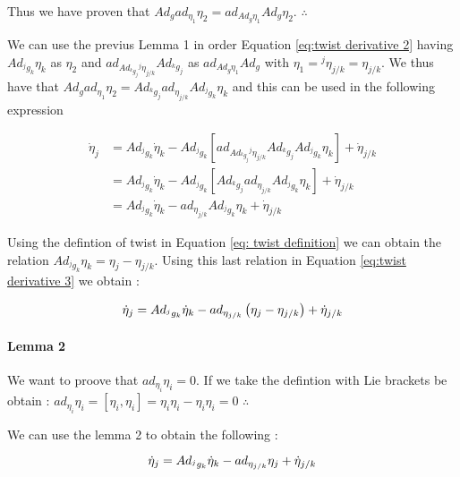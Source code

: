 \documentclass[12pt,a4paper]{book}
\begin{document}
Thus we have proven that $Ad_g ad_{\eta_1}\eta_2 = ad_{Ad_g\eta_1} Ad_g \eta_2$. $\therefore$


We can use the previus Lemma 1 in order Equation \eqref{eq:twist derivative 2} having $Ad_{^jg_k} \eta_k$ as $\eta_2$ and $ad_{Ad_{^kg_j} {^j {\eta}}_{j/k}} Ad_{^kg_j} $ as $ad_{Ad_g\eta_1} Ad_g$ with $\eta_1 = {^j {\eta}}_{j/k} = {\eta}_{j/k}$. We thus have that $Ad_g ad_{\eta_1}\eta_2 = Ad_{^kg_j} ad_{{\eta}_{j/k}} Ad_{^jg_k} \eta_k$ and this can be used in the following expression

\begin{equation}\label{eq:twist derivative 3}
\begin{aligned}
	\dot{\eta}_j 	&= Ad_{^jg_k} \dot{\eta}_k -  Ad_{^jg_k} \left[ ad_{Ad_{^kg_j} {^j {\eta}}_{j/k}} Ad_{^kg_j}  Ad_{^jg_k} \eta_k \right] + \dot{\eta}_{j/k} \\
					&= Ad_{^jg_k} \dot{\eta}_k - Ad_{^jg_k} \left[ Ad_{^kg_j} ad_{{\eta}_{j/k}} Ad_{^jg_k} \eta_k \right] + \dot{\eta}_{j/k} \\
					&= Ad_{^jg_k} \dot{\eta}_k - ad_{{\eta}_{j/k}} Ad_{^jg_k} \eta_k + \dot{\eta}_{j/k} 
\end{aligned}
\end{equation}

Using the defintion of twist in Equation \eqref{eq: twist definition} we can obtain the relation $Ad_{^jg_k} \eta_k = \eta_j - \eta_{j/k}$. Using this last relation in Equation \eqref{eq:twist derivative 3} we obtain :

\begin{equation}\label{eq:twist derivative 4}
	\dot{\eta}_j 	= Ad_{^jg_k} \dot{\eta}_k - ad_{{\eta}_{j/k}} \left( \eta_j - \eta_{j/k} \right) + \dot{\eta}_{j/k} \\
\end{equation}

\paragraph{Lemma 2}
We want to proove that $ad_{\eta_i} \eta_i = 0$. If we take the defintion with Lie brackets be obtain : $ad_{\eta_i} \eta_i = \left[ \eta_i, \eta_i\right] = \eta_i \eta_i - \eta_i \eta_i = 0$ $\therefore$



We can use the lemma 2 to obtain the following : 

\begin{equation}\label{eq:twist derivative 5}
	\dot{\eta}_j 	= Ad_{^jg_k} \dot{\eta}_k - ad_{{\eta}_{j/k}}  \eta_j + \dot{\eta}_{j/k} \\
\end{equation}
\end{document}
